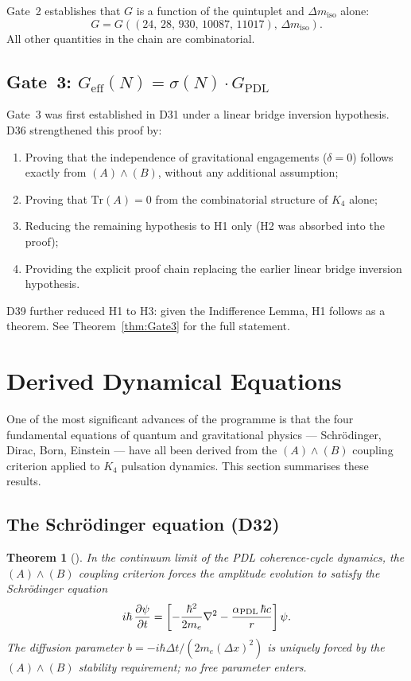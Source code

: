 \documentclass[11pt,a4paper]{article}
\theoremstyle{plain}
\newtheorem{theorem}{Theorem}[section]
\theoremstyle{definition}
\theoremstyle{remark}
\newcommand{\PDL}{\textnormal{PDL}}
\newcommand{\Kfour}{K_4}
\newcommand{\quintuplet}{(24,\,28,\,930,\,10087,\,11017)}
\newcommand{\Geff}{G_{\mathrm{eff}}}
\newcommand{\GPDL}{G_{\mathrm{PDL}}}
\newcommand{\sigmaN}{\sigma(N)}
\begin{document}
Gate~2 establishes that $G$ is a function of the quintuplet and $\Delta m_{\mathrm{iso}}$ alone:
\[
G = G(\quintuplet,\, \Delta m_{\mathrm{iso}}).
\]
All other quantities in the chain are combinatorial.

\subsection{Gate~3: \texorpdfstring{$\Geff(N) = \sigmaN \cdot \GPDL$}{Geff(N) = sigmaN . GPDL}}
\label{subsec:gate3}

Gate~3 was first established in D31 under a linear bridge inversion hypothesis.
D36 strengthened this proof by:
\begin{enumerate}
\item Proving that the independence of gravitational engagements ($\delta=0$) follows exactly from $(A)\wedge(B)$, without any additional assumption;
\item Proving that $\mathrm{Tr}(A)=0$ from the combinatorial structure of $\Kfour$ alone;
\item Reducing the remaining hypothesis to H1 only (H2 was absorbed into the proof);
\item Providing the explicit proof chain replacing the earlier linear bridge inversion hypothesis.
\end{enumerate}
D39 further reduced H1 to H3: given the Indifference Lemma, H1 follows as a theorem.
See Theorem~\ref{thm:Gate3} for the full statement.

\section{Derived Dynamical Equations}
\label{sec:dynamics}

One of the most significant advances of the programme is that the four fundamental equations of quantum and gravitational physics — Schr\"odinger, Dirac, Born, Einstein — have all been derived from the $(A)\wedge(B)$ coupling criterion applied to $\Kfour$ pulsation dynamics.
This section summarises these results.

\subsection{The Schr\"odinger equation (D32)}
\label{subsec:schrodinger}

\begin{theorem}[\citep{D32}]
\label{thm:Schrodinger}
In the continuum limit of the PDL coherence-cycle dynamics, the $(A)\wedge(B)$ coupling criterion forces the amplitude evolution to satisfy the Schr\"odinger equation
\[
i\hbar\,\frac{\partial\psi}{\partial t} = \left[-\frac{\hbar^2}{2m_e}\nabla^2 - \frac{\alpha_{\PDL}\,\hbar c}{r}\right]\psi.
\]
The diffusion parameter $b=-i\hbar\Delta t/(2m_e(\Delta x)^2)$ is uniquely forced by the $(A)\wedge(B)$ stability requirement; no free parameter enters.
\end{theorem}
\end{document}

